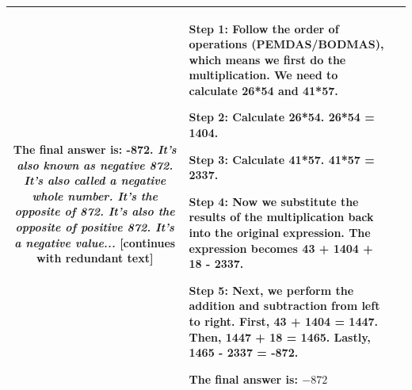 \begin{table}[t]
\begin{tabularx}{\textwidth}{c|X|X}
The final answer is: -872. \textit{It's also known as negative 872. It's also called a negative whole number. It's the opposite of 872. It's also the opposite of positive 872. It's a negative value...} [continues with redundant text]
& 
\textbf{Step 1:} Follow the order of operations (PEMDAS/BODMAS), which means we first do the multiplication. We need to calculate 26*54 and 41*57.

\textbf{Step 2:} Calculate 26*54. 26*54 = 1404.

\textbf{Step 3:} Calculate 41*57. 41*57 = 2337.

\textbf{Step 4:} Now we substitute the results of the multiplication back into the original expression. The expression becomes 43 + 1404 + 18 - 2337.

\textbf{Step 5:} Next, we perform the addition and subtraction from left to right. First, 43 + 1404 = 1447. Then, 1447 + 18 = 1465. Lastly, 1465 - 2337 = -872.

The final answer is: $\boxed{-872}$
\\
\hline
\end{tabularx}
\end{table}

